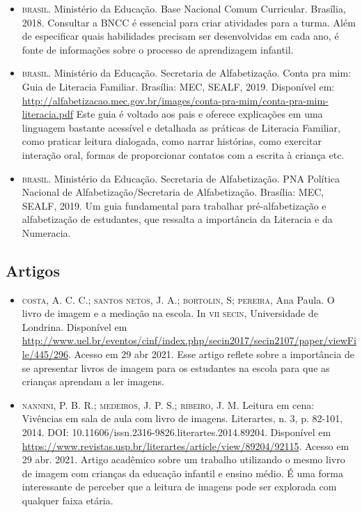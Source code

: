 \documentclass[11pt]{extarticle}
\begin{document}
\begin{itemize}
\item \textsc{brasil}. Ministério da Educação. Base Nacional Comum Curricular. Brasília, 2018.
Consultar a BNCC é essencial para criar atividades para a turma. Além de especificar 
quais habilidades precisam ser desenvolvidas em cada ano, é fonte de informações sobre 
o processo de aprendizagem infantil. 

\item \textsc{brasil}. Ministério da Educação. Secretaria de Alfabetização. Conta pra mim: Guia de Literacia Familiar. 
Brasília: MEC, SEALF, 2019. Disponível em: \url{http://alfabetizacao.mec.gov.br/images/conta-pra-mim/conta-pra-mim-literacia.pdf}
Este guia é voltado aos pais e oferece explicações em uma linguagem bastante acessível e detalhada as práticas de Literacia Familiar, 
como praticar leitura dialogada, como narrar histórias, como exercitar interação oral, formas de proporcionar contatos com a escrita à criança etc. 
 
\item \textsc{brasil}. Ministério da Educação. Secretaria de Alfabetização. PNA Política Nacional de Alfabetização/Secretaria 
de Alfabetização. Brasília: MEC, SEALF, 2019.
Um guia fundamental para trabalhar pré-alfabetização e alfabetização de estudantes, que ressalta a importância da Literacia e da Numeracia. 


\end{itemize}

\subsection{Artigos}

\begin{itemize}
\item \textsc{costa}, A. C. C.; \textsc{santos netos}, J. A.; \textsc{bortolin}, S; \textsc{pereira}, Ana Paula. O livro de imagem e a mediação na escola. 
In \textsc{vii secin}, Universidade de Londrina. Disponível em \url{http://www.uel.br/eventos/cinf/index.php/secin2017/secin2107/paper/viewFile/445/296}. 
Acesso em 29 abr 2021. 
Esse artigo reflete sobre a importância de se apresentar livros de imagem para os estudantes na escola para que as crianças aprendam a ler imagens. 

\item \textsc{nannini}, P. B. R.; \textsc{medeiros}, J. P. S.; \textsc{ribeiro}, J. M. Leitura em cena: Vivências em sala de aula com livro de imagens. 
Literartes, n. 3, p. 82-101, 2014. DOI: 10.11606/issn.2316-9826.literartes.2014.89204. 
Disponível em \url{https://www.revistas.usp.br/literartes/article/view/89204/92115}. Acesso em 29 abr. 2021. 
Artigo acadêmico sobre um trabalho utilizando o mesmo livro de imagem com crianças da educação infantil e ensino médio. 
É uma forma interessante de perceber que a leitura de imagens pode ser explorada com qualquer faixa etária. 
\end{itemize}

% 
\end{document}
